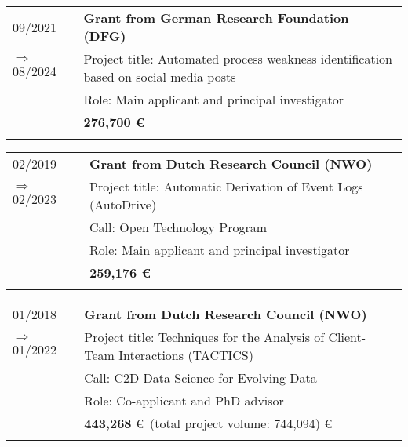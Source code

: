 \raggedright
\begin{tabular}{P{3cm}P{12cm}}

09/2021  														& \textbf{Grant from German Research Foundation (DFG)} \\
\hspace*{0.4cm} $\Rightarrow$ 08/2024 		& Project title: Automated process weakness identification based on social media posts \\
																		& Role: Main applicant and principal investigator \\\noalign{\smallskip}
																		& \textbf{276,700 \euro} \\
																		& \\
																																				\end{tabular}			
\begin{tabular}{P{3cm}P{12cm}}

02/2019  														& \textbf{Grant from Dutch Research Council (NWO)} \\
\hspace*{0.4cm} $\Rightarrow$ 02/2023 		& Project title: Automatic Derivation of Event Logs (AutoDrive) \\
																		& Call: Open Technology Program \\
																		& Role: Main applicant and principal investigator \\\noalign{\smallskip}
																		& \textbf{259,176 \euro} \\
																		& \\
																																				\end{tabular}														
\begin{tabular}{P{3cm}P{12cm}}
01/2018															& \textbf{Grant from Dutch Research Council (NWO)} \\
\hspace*{0.4cm} $\Rightarrow$ 01/2022 		& Project title: Techniques for the Analysis of Client-Team Interactions (TACTICS) \\
																		& Call: C2D Data Science for Evolving Data \\
																		& Role: Co-applicant and PhD advisor \\\noalign{\smallskip}
																		& \textbf{443,268} \euro \ (total project volume: 744,094) \euro \\
																		& \\
																		\end{tabular}														
